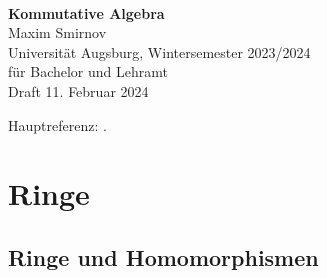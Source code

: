 \documentclass[reqno,12pt]{article}
\numberwithin{equation}{section}
\theoremstyle{plain}
\theoremstyle{definition}
\begin{document}
\thispagestyle{empty}

\
\vspace{100pt}

\begin{center}
{\huge \bf Kommutative Algebra} \\
\vspace{10pt}
{\Large Maxim Smirnov} \\
\vspace{10pt}
{\large Universität Augsburg, Wintersemester 2023/2024 \\
für Bachelor und Lehramt \\
}
\vspace{10pt}
Draft 11. Februar 2024
\end{center}



\newpage

{\footnotesize
\setcounter{tocdepth}{2}
\tableofcontents
}



\newpage

Hauptreferenz: \cite{AM}.


\newpage

\section{Ringe}

\subsection{Ringe und Homomorphismen}
\end{document}
